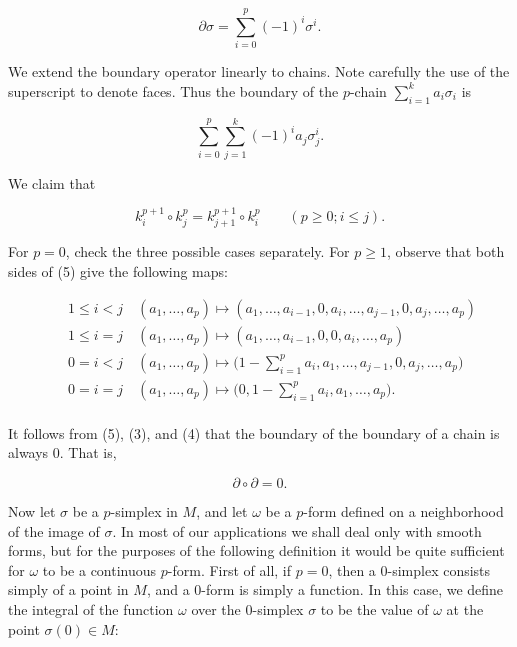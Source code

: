 \begin{equation}
\tag{4}\label{eq:4.6:4}
\partial\sigma=\sum_{i=0}^{p}(-1)^{i}\sigma^{i}.
\end{equation}

We extend the boundary operator linearly to chains. Note carefully the use of the superscript to denote faces. Thus the boundary of the $p$-chain $\sum_{i=1}^{k}a_{i}\sigma_{i}$ is

\[
\sum_{i=0}^{p}\sum_{j=1}^{k}(-1)^{i}a_{j}\sigma_{j}^{i}.
\]

\begin{center}
\end{center}

We claim that

\begin{equation}
\tag{5}\label{eq:4.6:5}
k_{i}^{p+1}\circ k_{j}^{p}=k_{j+1}^{p+1}\circ k_{i}^{p}\qquad(p\geq0;i\leq j).
\end{equation}

For $p=0$, check the three possible cases separately. For $p\geq1$, observe that both sides of (5) give the following maps:

\begin{equation}
\tag{6}\label{eq:4.6:6}
\begin{aligned}{}&{{}\quad1\leq i<j\quad(a_{1},\ldots,a_{p})\mapsto(a_{1},\ldots,a_{i-1},0,a_{i},\ldots,a_{j-1},0,a_{j},\ldots,a_{p})}\\ {}&{{}\quad1\leq i=j\quad(a_{1},\ldots,a_{p})\mapsto(a_{1},\ldots,a_{i-1},0,0,a_{i},\ldots,a_{p})}\\ {}&{{}\quad0=i<j\quad(a_{1},\ldots,a_{p})\mapsto\bigg(1-\sum_{i=1}^{p}a_{i},a_{1},\ldots,a_{j-1},0,a_{j},\ldots,a_{p}\bigg)}\\ {}&{{}\quad0=i=j\quad(a_{1},\ldots,a_{p})\mapsto\bigg(0,1-\sum_{i=1}^{p}a_{i},a_{1},\ldots,a_{p}\bigg).}\\ \end{aligned}
\end{equation}

It follows from (5), (3), and (4) that the boundary of the boundary of a chain is always 0. That is,

\begin{equation}
\tag{7}\label{eq:4.6:7}
\partial\circ\partial=0.
\end{equation}

Now let $\sigma$ be a $p$-simplex in $M$, and let $\omega$ be a $p$-form defined on a neighborhood of the image of $\sigma$. In most of our applications we shall deal only with smooth forms, but for the purposes of the following definition it would be quite sufficient for $\omega$ to be a continuous $p$-form. First of all, if $p = 0$, then a 0-simplex consists simply of a point in $M$, and a 0-form is simply a function. In this case, we define the integral of the function $\omega$ over the 0-simplex $\sigma$ to be the value of $\omega$ at the point $\sigma(0) \in M$:

